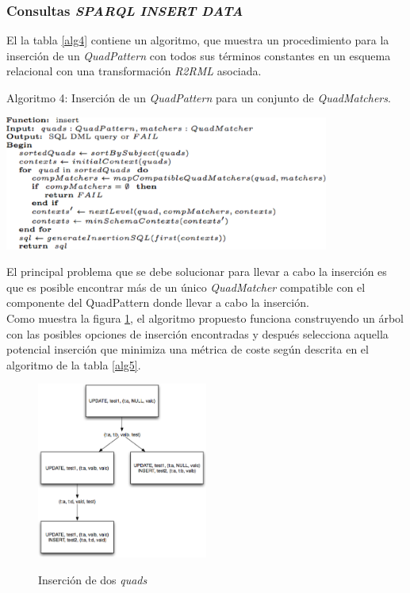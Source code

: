 \subsubsection{Consultas \textit{SPARQL} \textit{INSERT DATA}}

El la tabla \ref{alg4} contiene un algoritmo, que  muestra un procedimiento para la inserci\'on de un \textit{QuadPattern} con todos sus t\'erminos constantes en un esquema relacional con una transformaci\'on \textit{R2RML} asociada.\\

\begin{table}
\vspace{2.4in}
\caption{Algoritmo 4: Inserci\'on de un \textit{QuadPattern} para un conjunto de \textit{QuadMatchers}.}
\includegraphics[width=0.8\textwidth]{algoritmo4}
\label{alg4}
\end{table}


El principal problema que se debe solucionar para llevar a cabo la inserci\'on es que es posible encontrar m\'as de un \'unico \textit{QuadMatcher} compatible con el componente del QuadPattern donde llevar a cabo la inserci\'on.\\
Como muestra la figura \ref{figura3}, el algoritmo propuesto funciona construyendo un \'arbol con las posibles opciones de inserci\'on encontradas y despu\'es selecciona aquella potencial inserci\'on que minimiza una m\'etrica de coste seg\'un descrita en el algoritmo de la tabla \ref{alg5}.

\begin{figure}
\vspace{2.4in}
\caption{Inserci\'on de dos \textit{quads}}
\includegraphics[width=0.5\textwidth]{figura3}
\label{figura3}
\end{figure}

